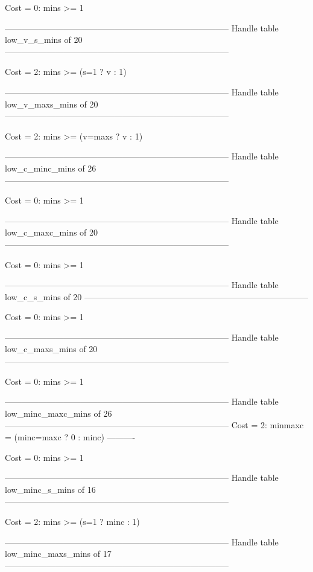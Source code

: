 Cost =  0:  mins >= 1

--------------------------------------------------------------------------------
Handle table low_v_s_mins of 20
--------------------------------------------------------------------------------

Cost =  2:  mins >= (s=1 ? v : 1)

--------------------------------------------------------------------------------
Handle table low_v_maxs_mins of 20
--------------------------------------------------------------------------------

Cost =  2:  mins >= (v=maxs ? v : 1)

--------------------------------------------------------------------------------
Handle table low_c_minc_mins of 26
--------------------------------------------------------------------------------

Cost =  0:  mins >= 1

--------------------------------------------------------------------------------
Handle table low_c_maxc_mins of 20
--------------------------------------------------------------------------------

Cost =  0:  mins >= 1

--------------------------------------------------------------------------------
Handle table low_c_s_mins of 20
--------------------------------------------------------------------------------

Cost =  0:  mins >= 1

--------------------------------------------------------------------------------
Handle table low_c_maxs_mins of 20
--------------------------------------------------------------------------------

Cost =  0:  mins >= 1

--------------------------------------------------------------------------------
Handle table low_minc_maxc_mins of 26
--------------------------------------------------------------------------------
Cost =  2:  minmaxc = (minc=maxc ? 0 : minc)
----------

Cost =  0:  mins >= 1

--------------------------------------------------------------------------------
Handle table low_minc_s_mins of 16
--------------------------------------------------------------------------------

Cost =  2:  mins >= (s=1 ? minc : 1)

--------------------------------------------------------------------------------
Handle table low_minc_maxs_mins of 17
--------------------------------------------------------------------------------

